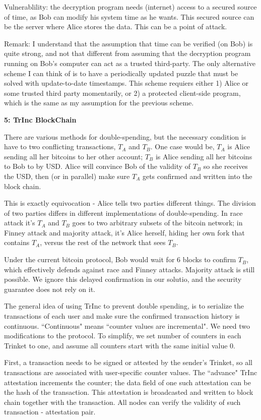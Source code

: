 \documentclass[10pt]{article}
\newcommand\question[2]{\vspace{.1in}\textbf{#1: #2}\vspace{.5em}\vspace{.10in}}
\begin{document}
Vulnerablility: the decryption program needs (internet) access to a secured
source of time, as Bob can modify his system time as he wants. This secured
source can be the server where Alice stores the data. This can be a point of
attack.

Remark: I understand that the assumption that time can be verified (on Bob) is
quite strong, and not that different from assuming that the decryption program
running on Bob's computer can act as a trusted third-party. The only alternative
scheme I can think of is to have a periodically updated puzzle that must be
solved with update-to-date timestamps. This scheme requiers either 1) Alice or
some trusted third party momentarily, or 2) a protected client-side program,
which is the same as my assumption for the previous scheme.


\newpage
\question{5}{TrInc BlockChain}

There are various methods for double-spending, but the necessary condition is
have to two conflicting transactions, $T_A$ and $T_B$. One case would be, $T_A$
is Alice sending all her bitcoins to her other account; $T_B$ is Alice sending
all her bitcoins to Bob to by USD. Alice will convince Bob of the validity of
$T_B$ so she receives the USD, then (or in parallel) make sure $T_A$ gets
confirmed and written into the block chain.

This is exactly equivocation - Alice tells two parties different things.  The
division of two parties differs in different implementations of double-spending.
In race attack it's $T_A$ and $T_B$ goes to two arbitrary subsets of the bitcoin
network; in Finney attack and majority attack, it's Alice herself, hiding her
own fork that contains $T_A$, versus the rest of the network that sees $T_B$.

Under the current bitcoin protocol, Bob would wait for 6 blocks to confirm
$T_B$, which effectively defends against race and Finney attacks. Majority
attack is still possible. We ignore this delayed confirmation in our solutio,
and the security guarantee does not rely on it.

The general idea of using TrInc to prevent double spending, is to serialize the
transactions of each user and make sure the confirmed transaction history is
continuous. ``Continuous" means ``counter values are incremental".
We need two modifications to the protocol. To simplify, we set number of
counters in each Trinket to one, and assume all counters start with the same
initial value $0$.

First, a transaction needs to be signed or attested by the sender's Trinket, so
all transactions are associated with user-specific counter values. The 
``advance" TrInc attestation increments the counter; the data field of one such
attestation can be the hash of the transaction. This attestation is broadcasted
and written to block chain together with the transaction. All nodes can verify
the validity of such transaction - attestation pair.
\end{document}

